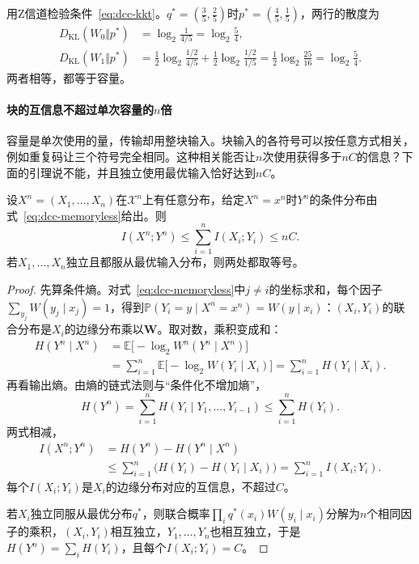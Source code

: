 用Z信道检验条件~\eqref{eq:dcc-kkt}。$q^{*}=(\tfrac35,\tfrac25)$时$p^{*}=(\tfrac45,\tfrac15)$，两行的散度为
\[
 \begin{aligned}
 D_{\mathrm{KL}}(W_0\Vert p^{*})&=\log_2\frac{1}{4/5}=\log_2\frac54 ,\\
 D_{\mathrm{KL}}(W_1\Vert p^{*})&=\frac12\log_2\frac{1/2}{4/5}+\frac12\log_2\frac{1/2}{1/5}=\frac12\log_2\frac{25}{16}=\log_2\frac54 .
 \end{aligned}
\]
两者相等，都等于容量。

\paragraph{块的互信息不超过单次容量的$n$倍}
容量是单次使用的量，传输却用整块输入。块输入的各符号可以按任意方式相关，例如重复码让三个符号完全相同。这种相关能否让$n$次使用获得多于$nC$的信息？下面的引理说不能，并且独立使用最优输入恰好达到$nC$。

\begin{lemma}[块互信息的单次上界]
\label{lem:dcc-block-bound}
设$X^n=(X_1,\dots,X_n)$在$\mathcal{X}^n$上有任意分布，给定$X^n=x^n$时$Y^n$的条件分布由式~\eqref{eq:dcc-memoryless}给出。则
\begin{equation}
 I(X^n;Y^n)\leq\sum_{i=1}^{n}I(X_i;Y_i)\leq nC .
 \label{eq:dcc-block-bound}
\end{equation}
若$X_1,\dots,X_n$独立且都服从最优输入分布，则两处都取等号。
\end{lemma}

\begin{proof}
先算条件熵。对式~\eqref{eq:dcc-memoryless}中$j\neq i$的坐标求和，每个因子$\sum_{y_j}W(y_j\mid x_j)=1$，得到$\mathbb{P}(Y_i=y\mid X^n=x^n)=W(y\mid x_i)$：$(X_i,Y_i)$的联合分布是$X_i$的边缘分布乘以$\bm{W}$。取对数，乘积变成和：
\[
 \begin{aligned}
 H(Y^n\mid X^n)&=\mathbb{E}\bigl[-\log_2W^n(Y^n\mid X^n)\bigr]\\
 &=\sum_{i=1}^{n}\mathbb{E}\bigl[-\log_2W(Y_i\mid X_i)\bigr]=\sum_{i=1}^{n}H(Y_i\mid X_i) .
 \end{aligned}
\]
再看输出熵。由熵的链式法则与“条件化不增加熵”，
\[
 H(Y^n)=\sum_{i=1}^{n}H(Y_i\mid Y_1,\dots,Y_{i-1})\leq\sum_{i=1}^{n}H(Y_i) .
\]
两式相减，
\[
 \begin{aligned}
 I(X^n;Y^n)&=H(Y^n)-H(Y^n\mid X^n)\\
 &\leq\sum_{i=1}^{n}\bigl(H(Y_i)-H(Y_i\mid X_i)\bigr)=\sum_{i=1}^{n}I(X_i;Y_i) .
 \end{aligned}
\]
每个$I(X_i;Y_i)$是$X_i$的边缘分布对应的互信息，不超过$C$。

若$X_i$独立同服从最优分布$q^{*}$，则联合概率$\prod_iq^{*}(x_i)W(y_i\mid x_i)$分解为$n$个相同因子的乘积，$(X_i,Y_i)$相互独立，$Y_1,\dots,Y_n$也相互独立，于是$H(Y^n)=\sum_iH(Y_i)$，且每个$I(X_i;Y_i)=C$。
\end{proof}

